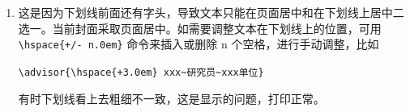 \begin{enumerate}
                \item 这是因为下划线前面还有字头，导致文本只能在页面居中和在下划线上居中二选一。当前封面采取页面居中。如需要调整文本在下划线上的位置，可用 \verb|\hspace{+/- n.0em}| 命令来插入或删除 n 个空格，进行手动调整，比如

                \verb|\advisor{\hspace{+3.0em} xxx~研究员~xxx单位}|

                有时下划线看上去粗细不一致，这是显示的问题，打印正常。
        \end{enumerate}
